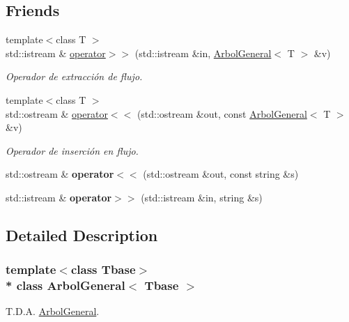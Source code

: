 \subsection*{Friends}
\begin{DoxyCompactItemize}
\item 
{\footnotesize template$<$class T $>$ }\\std\+::istream \& \hyperlink{class_arbol_general_ab1318141f030856da7dcfc1c7a162565}{operator$>$$>$} (std\+::istream \&in, \hyperlink{class_arbol_general}{Arbol\+General}$<$ T $>$ \&v)
\begin{DoxyCompactList}\small\item\em Operador de extracción de flujo. \end{DoxyCompactList}\item 
{\footnotesize template$<$class T $>$ }\\std\+::ostream \& \hyperlink{class_arbol_general_a4e1153e673608d812c48de2a33bbead0}{operator$<$$<$} (std\+::ostream \&out, const \hyperlink{class_arbol_general}{Arbol\+General}$<$ T $>$ \&v)
\begin{DoxyCompactList}\small\item\em Operador de inserción en flujo. \end{DoxyCompactList}\item 
std\+::ostream \& {\bfseries operator$<$$<$} (std\+::ostream \&out, const string \&s)\hypertarget{class_arbol_general_aa002df599d9088a137829612d9cdba6d}{}\label{class_arbol_general_aa002df599d9088a137829612d9cdba6d}

\item 
std\+::istream \& {\bfseries operator$>$$>$} (std\+::istream \&in, string \&s)\hypertarget{class_arbol_general_a7b9d9102eb45e3c0c9404a664a6ff64d}{}\label{class_arbol_general_a7b9d9102eb45e3c0c9404a664a6ff64d}

\end{DoxyCompactItemize}


\subsection{Detailed Description}
\subsubsection*{template$<$class Tbase$>$\\*
class Arbol\+General$<$ Tbase $>$}

T.\+D.\+A. \hyperlink{class_arbol_general}{Arbol\+General}. 

